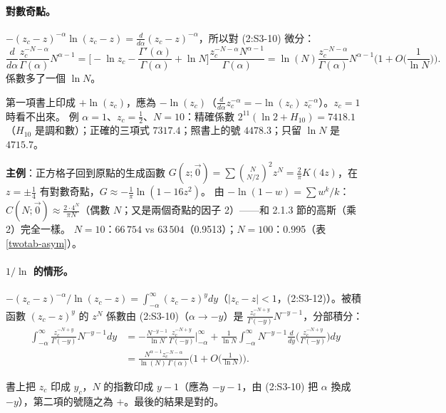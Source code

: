 \paragraph{對數奇點。}
$-(z_c-z)^{-\alpha}\ln(z_c-z)=\frac{d}{d\alpha}(z_c-z)^{-\alpha}$，所以對 (2:S3-10) 微分：
\[\frac{d}{d\alpha}\frac{z_c^{-N-\alpha}}{\Gamma(\alpha)}N^{\alpha-1}=\Big[-\ln z_c-\frac{\Gamma'(\alpha)}{\Gamma(\alpha)}+\ln N\Big]\frac{z_c^{-N-\alpha}N^{\alpha-1}}{\Gamma(\alpha)}
=\ln(N)\frac{z_c^{-N-\alpha}}{\Gamma(\alpha)}N^{\alpha-1}\Big(1+O\Big(\frac1{\ln N}\Big)\Big).\tag{2:S3-11}\]
係數多了一個 $\ln N$。
\begin{errbox}[p.~50，(2:S3-11)]
第一項書上印成 $+\ln(z_c)$，應為 $-\ln(z_c)$（$\frac{d}{d\alpha}z_c^{-\alpha}=-\ln(z_c)\,z_c^{-\alpha}$）。$z_c=1$ 時看不出來。
例 $\alpha=1$、$z_c=\frac12$、$N=10$：精確係數 $2^{11}(\ln2+H_{10})=7418.1$（$H_{10}$ 是調和數）；正確的三項式 $7317.4$；照書上的號 $4478.3$；只留 $\ln N$ 是 $4715.7$。
\end{errbox}
\textbf{主例}：正方格子回到原點的生成函數 $G(z;\vec0)=\sum\binom{N}{N/2}^2z^N=\frac2\pi K(4z)$，在 $z=\pm\frac14$ 有對數奇點，$G\approx-\frac1\pi\ln(1-16z^2)$。
由 $-\ln(1-w)=\sum w^k/k$：$C(N;\vec0)\approx\frac{2\cdot4^N}{\pi N}$（偶數 $N$；又是兩個奇點的因子 2）——和 2.1.3 節的高斯（乘 2）完全一樣。
$N=10$：$66\,754$ vs $63\,504$（0.9513）；$N=100$：0.995（表 \ref{twotab-asym}）。
\begin{table}[H]
\centering
\caption{係數與它們的漸近式：一維 $\binom{2N}N$（分支點 $\alpha=\frac12$）與正方格子（對數奇點）}\label{twotab-asym}
\TwoTabAsym
\end{table}

\paragraph{$1/\ln$ 的情形。}
$-(z_c-z)^{-\alpha}/\ln(z_c-z)=\int_{-\alpha}^\infty(z_c-z)^ydy$（$|z_c-z|<1$，(2:S3-12)）。被積函數 $(z_c-z)^y$ 的 $z^N$ 係數由 (2:S3-10)（$\alpha\to-y$）是
$\frac{z_c^{-N+y}}{\Gamma(-y)}N^{-y-1}$，分部積分：
\[\begin{aligned}\int_{-\alpha}^\infty\frac{z_c^{-N+y}}{\Gamma(-y)}N^{-y-1}dy
&=-\frac{N^{-y-1}}{\ln N}\frac{z_c^{-N+y}}{\Gamma(-y)}\Big|_{-\alpha}^\infty+\frac1{\ln N}\int_{-\alpha}^\infty N^{-y-1}\frac{d}{dy}\Big(\frac{z_c^{-N+y}}{\Gamma(-y)}\Big)dy\\
&=\frac{N^{\alpha-1}z_c^{-N-\alpha}}{\ln(N)\,\Gamma(\alpha)}\Big(1+O\Big(\frac1{\ln N}\Big)\Big).\end{aligned}\tag{2:S3-13}\]
\begin{errbox}[p.~50，(2:S3-13)]
書上把 $z_c$ 印成 $y_c$，$N$ 的指數印成 $y-1$（應為 $-y-1$，由 (2:S3-10) 把 $\alpha$ 換成 $-y$），第二項的號隨之為 $+$。最後的結果是對的。
\end{errbox}

